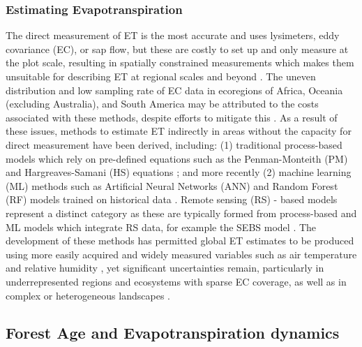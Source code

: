 \documentclass[paper=a4,fontsize=12pt]{scrartcl}
\begin{document}
\subsubsection{Estimating Evapotranspiration}
\par The direct measurement of ET is the most accurate and uses lysimeters, eddy covariance (EC), or sap flow, but these are costly to set up and only measure at the plot scale, resulting in spatially constrained measurements which makes them unsuitable for describing ET at regional scales and beyond \parencite{amani2023review,liyew2025review}. The uneven distribution and low sampling rate of EC data in ecoregions of Africa, Oceania (excluding Australia), and South America may be attributed to the costs associated with these methods, despite efforts to mitigate this \parencite{hill2017case, markwitz2019low}. As a result of these issues, methods to estimate ET indirectly in areas without the capacity for direct measurement have been derived, including: (1) traditional process-based models which rely on pre-defined equations such as the Penman-Monteith (PM) and Hargreaves-Samani (HS) equations \parencite{monteith1965evaporation, hargreaves1985reference}; and more recently (2) machine learning (ML) methods such as Artificial Neural Networks (ANN) and Random Forest (RF) models trained on historical data \parencite{xu2018evaluating}. Remote sensing (RS) - based models represent a distinct category as these are typically formed from process-based and ML models which integrate RS data, for example the SEBS model \parencite{su2002surface}. The development of these methods has permitted global ET estimates to be produced using more easily acquired and widely measured variables such as air temperature and relative humidity \parencite{pan2020evaluation}, yet significant uncertainties remain, particularly in underrepresented regions and ecosystems with sparse EC coverage, as well as in complex or heterogeneous landscapes \parencite{xu2018evaluating, amani2023review}.

\subsection{Forest Age and Evapotranspiration dynamics}
\end{document}
